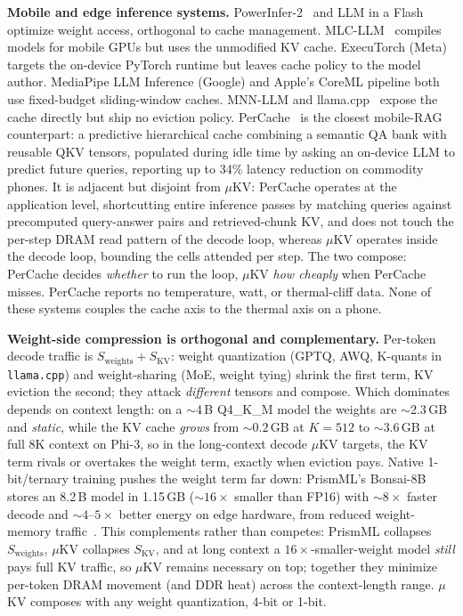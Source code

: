 \documentclass[sigconf, anonymous=false, screen=true]{acmart}
\begin{document}
\textbf{Mobile and edge inference systems.} PowerInfer-2~\cite{song2024powerinfer2} and LLM in a Flash~\cite{alizadeh2023llm} optimize weight access, orthogonal to cache management. MLC-LLM~\cite{mlcllm} compiles models for mobile GPUs but uses the unmodified KV cache. ExecuTorch (Meta) targets the on-device PyTorch runtime but leaves cache policy to the model author. MediaPipe LLM Inference (Google) and Apple's CoreML pipeline both use fixed-budget sliding-window caches. MNN-LLM and llama.cpp~\cite{llamacpp} expose the cache directly but ship no eviction policy. PerCache~\cite{liu2025percache} is the closest mobile-RAG counterpart: a predictive hierarchical cache combining a semantic QA bank with reusable QKV tensors, populated during idle time by asking an on-device LLM to predict future queries, reporting up to 34\% latency reduction on commodity phones. It is adjacent but disjoint from $\mu$KV: PerCache operates at the application level, shortcutting entire inference passes by matching queries against precomputed query-answer pairs and retrieved-chunk KV, and does not touch the per-step DRAM read pattern of the decode loop, whereas $\mu$KV operates inside the decode loop, bounding the cells attended per step. The two compose: PerCache decides \emph{whether} to run the loop, $\mu$KV \emph{how cheaply} when PerCache misses. PerCache reports no temperature, watt, or thermal-cliff data. None of these systems couples the cache axis to the thermal axis on a phone.

\textbf{Weight-side compression is orthogonal and complementary.} Per-token decode traffic is $S_\mathrm{weights}+S_\mathrm{KV}$: weight quantization (GPTQ, AWQ, K-quants in \texttt{llama.cpp}) and weight-sharing (MoE, weight tying) shrink the first term, KV eviction the second; they attack \emph{different} tensors and compose. Which dominates depends on context length: on a $\sim$4\,B Q4\_K\_M model the weights are $\sim$2.3\,GB and \emph{static}, while the KV cache \emph{grows} from ${\sim}0.2$\,GB at $K{=}512$ to ${\sim}3.6$\,GB at full 8K context on Phi-3, so in the long-context decode $\mu$KV targets, the KV term rivals or overtakes the weight term, exactly when eviction pays. Native 1-bit/ternary training pushes the weight term far down: PrismML's Bonsai-8B stores an 8.2\,B model in 1.15\,GB (${\sim}16\times$ smaller than FP16) with ${\sim}8\times$ faster decode and ${\sim}4$--$5\times$ better energy on edge hardware, from reduced weight-memory traffic~\cite{prismml2026bonsai}. This complements rather than competes: PrismML collapses $S_\mathrm{weights}$, $\mu$KV collapses $S_\mathrm{KV}$, and at long context a $16\times$-smaller-weight model \emph{still} pays full KV traffic, so $\mu$KV remains necessary on top; together they minimize per-token DRAM movement (and DDR heat) across the context-length range. $\mu$KV composes with any weight quantization, 4-bit or 1-bit.
\end{document}

